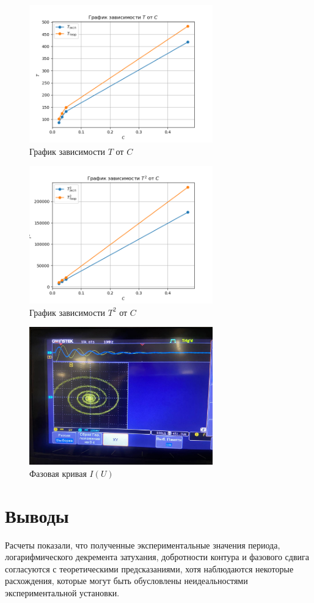 \documentclass{article}%
\begin{document}
%


\begin{figure}[h!]%
\centering%
\includegraphics[width=300px]{T_vs_C.png}%
\caption{График зависимости $T$ от $C$}%
\end{figure}

%


\begin{figure}[h!]%
\centering%
\includegraphics[width=300px]{T^2_vs_C.png}%
\caption{График зависимости $T^2$ от $C$}%
\end{figure}

%


\begin{figure}[h!]%
\centering%
\includegraphics[width=300px]{lab_3_10_petly.jpg}%
\caption{Фазовая кривая $I(U)$}%
\end{figure}

%
\newpage%
\section{Выводы}%
\label{sec:}%
Расчеты показали, что полученные экспериментальные значения периода, логарифмического декремента затухания, добротности контура и фазового сдвига согласуются с теоретическими предсказаниями, хотя наблюдаются некоторые расхождения, которые могут быть обусловлены неидеальностями экспериментальной установки.

%
\end{document}
